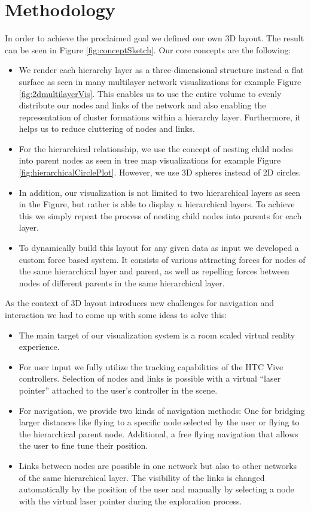 \section{Methodology}
In order to achieve the proclaimed goal we defined our own 3D layout. The result can be seen in Figure \ref{fig:conceptSketch}. Our core concepts are the following: 
\begin{itemize}
    \item We render each hierarchy layer as a three-dimensional structure instead a flat surface as seen in many multilayer network visualizations for example Figure \ref{fig:2dmultilayerVis}. This enables us to use the entire volume to evenly distribute our nodes and links of the network and also enabling the representation of cluster formations within a hierarchy layer. Furthermore, it helps us to reduce cluttering of nodes and links.
    \item For the hierarchical relationship, we use the concept of nesting child nodes into parent nodes as seen in tree map visualizations for example Figure \ref{fig:hierarchicalCirclePlot}. However, we use 3D spheres instead of 2D circles. 
    \item In addition, our visualization is not limited to two hierarchical layers as seen in the Figure, but rather is able to display $n$ hierarchical layers. To achieve this we simply repeat the process of nesting child nodes into parents for each layer.
    \item To dynamically build this layout for any given data as input we developed a custom force based system. It consists of various attracting forces for nodes of the same hierarchical layer and parent, as well as repelling forces between nodes of different parents in the same hierarchical layer.
\end{itemize}
As the context of 3D layout introduces new challenges for navigation and interaction we had to come up with some ideas to solve this: 
\begin{itemize}
    \item The main target of our visualization system is a room scaled virtual reality experience.
    \item For user input we fully utilize the tracking capabilities of the HTC Vive controllers. Selection of nodes and links is possible with a virtual “laser pointer” attached to the user's controller in the scene.
    \item For navigation, we provide two kinds of navigation methods: One for bridging larger distances like flying to a specific node selected by the user or flying to the hierarchical parent node. Additional, a free flying navigation that allows the user to fine tune their position.
    \item Links between nodes are possible in one network but also to other networks of the same hierarchical layer. The visibility of the links is changed automatically by the position of the user and manually by selecting a node with the virtual laser pointer during the exploration process. 
\end{itemize}
